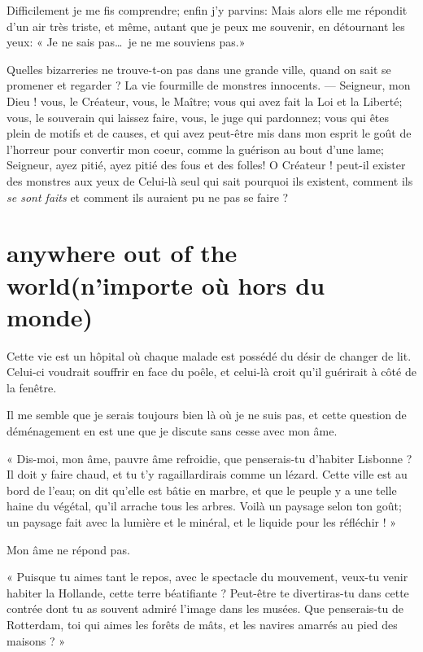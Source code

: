 Difficilement je me fis comprendre; enfin j’y parvins:
Mais alors elle me répondit d’un air très triste, et
même, autant que je peux me souvenir, en détournant les yeux: « Je ne
sais pas\ldots\ je ne me souviens pas.»

Quelles bizarreries ne trouve{}-t{}-on pas dans une grande ville, quand
on sait se promener et regarder ? La vie fourmille de monstres
innocents. --- Seigneur, mon Dieu ! vous, le Créateur, vous, le Maître;
vous qui avez fait la Loi et la Liberté; vous, le souverain qui laissez
faire, vous, le juge qui pardonnez; vous qui êtes plein de motifs et de
causes, et qui avez peut{}-être mis dans mon esprit le goût de
l’horreur pour convertir mon coeur, comme la guérison
au bout d’une lame; Seigneur, ayez pitié, ayez pitié
des fous et des folles! O Créateur ! peut{}-il exister des monstres aux
yeux de Celui{}-là seul qui sait pourquoi ils existent, comment ils \textit{se
sont faits} et comment ils auraient pu ne pas se faire ?

\quebra\section[Anywhere out of the world (n’importe où hors du monde)]{anywhere out of the world\break (n’importe où hors du monde)}

Cette vie est un hôpital où chaque malade est possédé du désir de
changer de lit. Celui{}-ci voudrait souffrir en face du poêle, et
celui{}-là croit qu’il guérirait à côté de la fenêtre.

Il me semble que je serais toujours bien là où je ne suis pas, et cette
question de déménagement en est une que je discute sans cesse avec mon
âme.

« Dis{}-moi, mon âme, pauvre âme refroidie, que penserais{}-tu
d’habiter Lisbonne ? Il doit y faire chaud, et tu
t’y ragaillardirais comme un lézard. Cette ville est
au bord de l’eau; on dit qu’elle est
bâtie en marbre, et que le peuple y a une telle haine du végétal,
qu’il arrache tous les arbres. Voilà un paysage selon
ton goût; un paysage fait avec la lumière et le minéral, et le liquide
pour les réfléchir ! »

Mon âme ne répond pas.

« Puisque tu aimes tant le repos, avec le spectacle du mouvement,
veux{}-tu venir habiter la Hollande, cette terre béatifiante ?
Peut{}-être te divertiras{}-tu dans cette contrée dont tu as souvent
admiré l’image dans les musées. Que penserais{}-tu de
Rotterdam, toi qui aimes les forêts de mâts, et les navires amarrés au
pied des maisons ? »

